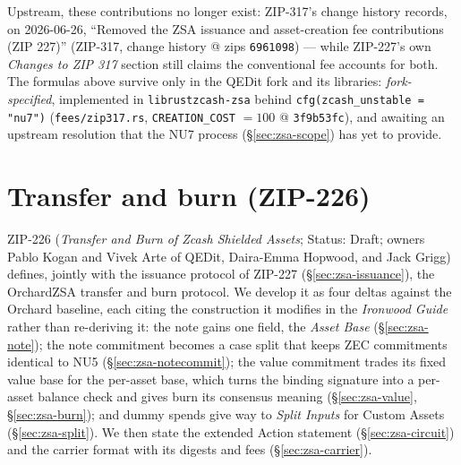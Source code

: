 \documentclass[11pt,a4paper]{article}
\theoremstyle{definition}
\begin{document}
Upstream, these contributions no longer exist: ZIP-317's change history
records, on 2026-06-26, ``Removed the ZSA issuance and asset-creation
fee contributions (ZIP 227)'' (ZIP-317, change history @ zips
\texttt{6961098}) --- while ZIP-227's own \emph{Changes to ZIP 317}
section still claims the conventional fee accounts for both. The
formulas above survive only in the QEDit fork and its libraries:
\emph{fork-specified}, implemented in \texttt{librustzcash-zsa} behind
\texttt{cfg(zcash\_unstable = "nu7")} (\texttt{fees/zip317.rs},
\texttt{CREATION\_COST} $= 100$ @ \texttt{3f9b53fc}), and awaiting an
upstream resolution that the NU7 process (\S\ref{sec:zsa-scope}) has yet
to provide.

\section{Transfer and burn (ZIP-226)}\label{sec:zsa-transfer}

ZIP-226 (\emph{Transfer and Burn of Zcash Shielded Assets}; Status: Draft;
owners Pablo Kogan and Vivek Arte of QEDit, Daira-Emma Hopwood, and Jack
Grigg) defines, jointly with the issuance protocol of ZIP-227
(\S\ref{sec:zsa-issuance}), the OrchardZSA transfer and burn protocol. We
develop it as four deltas against the Orchard baseline, each citing the
construction it modifies in the \emph{Ironwood Guide} rather than re-deriving
it: the note gains one field, the \emph{Asset Base} (\S\ref{sec:zsa-note});
the note commitment becomes a case split that keeps ZEC commitments identical
to NU5 (\S\ref{sec:zsa-notecommit}); the value commitment trades its fixed
value base for the per-asset base, which turns the binding signature into a
per-asset balance check and gives burn its consensus meaning
(\S\ref{sec:zsa-value}, \S\ref{sec:zsa-burn}); and dummy spends give way to
\emph{Split Inputs} for Custom Assets (\S\ref{sec:zsa-split}). We then state
the extended Action statement (\S\ref{sec:zsa-circuit}) and the carrier
format with its digests and fees (\S\ref{sec:zsa-carrier}).
\end{document}
